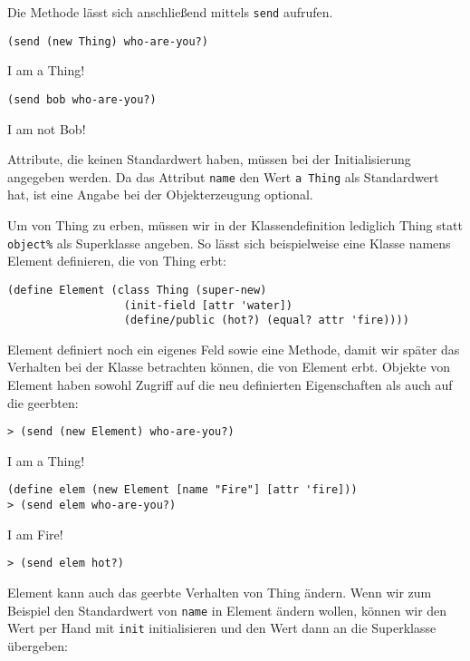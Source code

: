 Die Methode lässt sich anschließend mittels \texttt{send} aufrufen.

\begin{lstlisting}
(send (new Thing) who-are-you?)
\end{lstlisting}
{\routput {\qq}I am a Thing!{\qq}}

\begin{lstlisting}
(send bob who-are-you?)
\end{lstlisting}
{\routput {\qq}I am not Bob!{\qq}}

Attribute, die keinen Standardwert haben, müssen bei der Initialisierung angegeben werden. Da das Attribut \texttt{name} den Wert  \texttt{{\qq}a Thing{\qq}} als Standardwert hat, ist eine Angabe bei der Objekterzeugung optional. 

Um von Thing zu erben, müssen wir in der Klassendefinition lediglich Thing statt \texttt{object\%} als Superklasse angeben. So lässt sich beispielweise eine Klasse namens Element definieren, die von Thing erbt:

\begin{lstlisting}
(define Element (class Thing (super-new)
                  (init-field [attr 'water])
                  (define/public (hot?) (equal? attr 'fire))))
\end{lstlisting}

Element definiert noch ein eigenes Feld sowie eine Methode, damit wir später das Verhalten bei der Klasse betrachten können, die von Element erbt. Objekte von Element haben sowohl Zugriff auf die neu definierten Eigenschaften als auch auf die geerbten:

\begin{lstlisting}
> (send (new Element) who-are-you?)
\end{lstlisting}
{\routput {\qq}I am a Thing!\qq}

\begin{lstlisting}
(define elem (new Element [name "Fire"] [attr 'fire]))
> (send elem who-are-you?)
\end{lstlisting} 
{\routput {\qq}I am Fire!\qq}
\begin{lstlisting}
> (send elem hot?)
\end{lstlisting} 
{}

Element kann auch das geerbte Verhalten von Thing ändern. Wenn wir zum Beispiel den Standardwert von \texttt{name} in Element ändern wollen, können wir den Wert per Hand mit \texttt{init} initialisieren und den Wert dann an die Superklasse übergeben:

